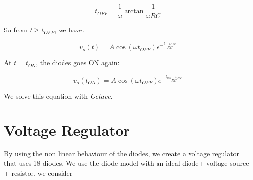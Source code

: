 \begin{equation}
  t_{OFF} = \frac{1}{\omega}\arctan\frac{1}{\omega RC}
\end{equation}

So from $t \geq t_{OFF}$, we have:

\begin{equation}
  v_o(t) = A\cos(\omega t_{OFF}) e^{-\frac{t-t_{OFF}}{RC}}
\end{equation}

At $t = t_{ON}$, the diodes goes ON again:

\begin{equation}
  v_o(t_{ON}) = A\cos(\omega t_{OFF}) e^{-\frac{t_{ON}-t_{OFF}}{RC}}
\end{equation}

We solve this equation with \textit{Octave}.


\section{Voltage Regulator}

By using the non linear behaviour of the diodes, we create a voltage regulator that uses 18 diodes.
We use the diode model with an ideal diode+ voltage source + resistor. we consider



